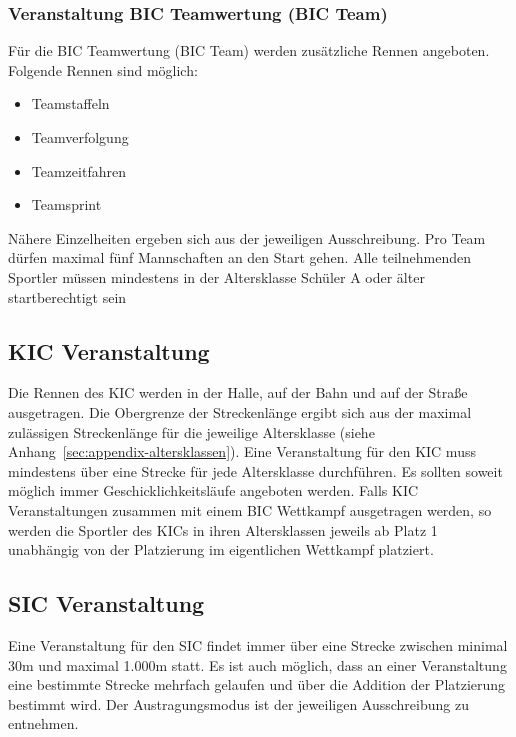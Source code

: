 \subsubsection{Veranstaltung BIC Teamwertung (BIC Team)}
Für die BIC Teamwertung (BIC Team) werden zusätzliche Rennen angeboten. Folgende Rennen sind möglich:
\begin{itemize}
	\item Teamstaffeln
	\item Teamverfolgung
	\item Teamzeitfahren
	\item Teamsprint
\end{itemize}
Nähere Einzelheiten ergeben sich aus der jeweiligen Ausschreibung. Pro Team dürfen maximal fünf Mannschaften an den Start gehen. Alle teilnehmenden Sportler müssen mindestens in der Altersklasse Schüler A oder älter startberechtigt sein

\subsection{KIC Veranstaltung}
Die Rennen des KIC werden in der Halle, auf der Bahn und auf der Straße ausgetragen. Die Obergrenze der Streckenlänge ergibt sich aus der maximal zulässigen Streckenlänge für die jeweilige Altersklasse (siehe Anhang~\ref{sec:appendix-altersklassen}). Eine Veranstaltung für den KIC muss mindestens über eine Strecke für jede Altersklasse durchführen. Es sollten soweit möglich immer Geschicklichkeitsläufe angeboten werden. Falls KIC Veranstaltungen zusammen mit einem BIC Wettkampf ausgetragen werden, so werden die Sportler des KICs in ihren Altersklassen jeweils ab Platz 1 unabhängig von der Platzierung im eigentlichen Wettkampf platziert.

\subsection{SIC Veranstaltung}
Eine Veranstaltung für den SIC findet immer über eine Strecke zwischen minimal 30m und maximal 1.000m statt. Es ist auch möglich, dass an einer Veranstaltung eine bestimmte Strecke mehrfach gelaufen und über die Addition der Platzierung bestimmt wird. Der Austragungsmodus ist der jeweiligen Ausschreibung zu entnehmen.